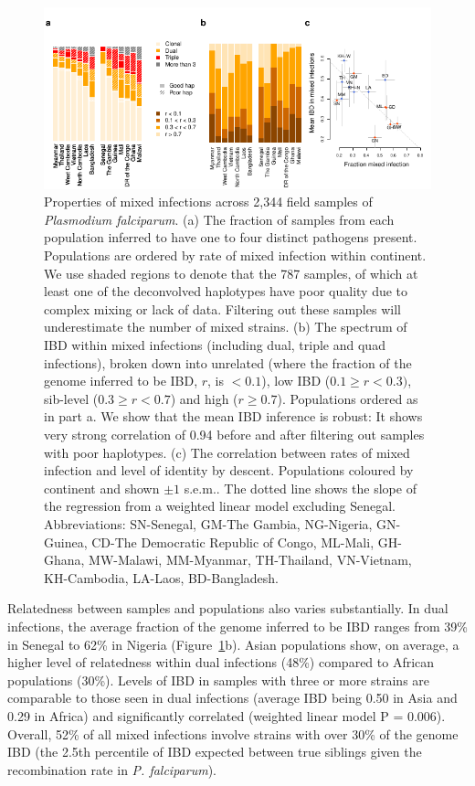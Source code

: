 \documentclass[9pt,lineno]{elife}
\begin{document}
\begin{figure}[h]
  \begin{center}
    \includegraphics[width=\textwidth]{Fig3.pdf}
    \caption{Properties of mixed infections across 2,344 field samples of {\it Plasmodium falciparum}. (a) The fraction of samples from each population inferred to have one to four distinct pathogens present.  Populations are ordered by rate of mixed infection within continent. We use shaded regions to denote that the 787 samples, of which at least one of the deconvolved haplotypes have poor quality due to complex mixing or lack of data. Filtering out these samples will underestimate the number of mixed strains. (b) The spectrum of IBD within mixed infections (including dual, triple and quad infections), broken down into unrelated (where the fraction of the genome inferred to be IBD, $r$, is $< 0.1$), low IBD ($0.1 \geq r < 0.3)$, sib-level ($0.3 \geq r<0.7$) and high ($r \geq 0.7$).  Populations ordered as in part a. We show that the mean IBD inference is robust: It shows very strong correlation of 0.94 before and after filtering out samples with poor haplotypes. (c) The correlation between rates of mixed infection and level of identity by descent. Populations coloured by continent and shown $\pm 1$ s.e.m..  The dotted line shows the slope of the regression from a weighted linear model excluding Senegal.  Abbreviations: SN-Senegal, GM-The Gambia, NG-Nigeria, GN-Guinea, CD-The Democratic Republic of Congo, ML-Mali, GH-Ghana, MW-Malawi, MM-Myanmar, TH-Thailand, VN-Vietnam, KH-Cambodia, LA-Laos, BD-Bangladesh.} \label{fig:mixInfPlot}
  \end{center}
\end{figure}


Relatedness between samples and populations also varies substantially.  In dual infections, the average fraction of the genome inferred to be IBD ranges from 39\% in Senegal to 62\% in Nigeria (Figure~\ref{fig:mixInfPlot}b).   Asian populations show, on average, a higher level of relatedness within dual infections (48\%) compared to African populations (30\%).  Levels of IBD in samples with three or more strains are comparable to those seen in dual infections (average IBD being 0.50 in Asia and 0.29 in Africa) and significantly correlated (weighted linear model P = 0.006).  Overall, 52\% of all mixed infections involve strains with over 30\% of the genome IBD (the 2.5th percentile of IBD expected between true siblings given the recombination rate in {\it P. falciparum}).
\end{document}
